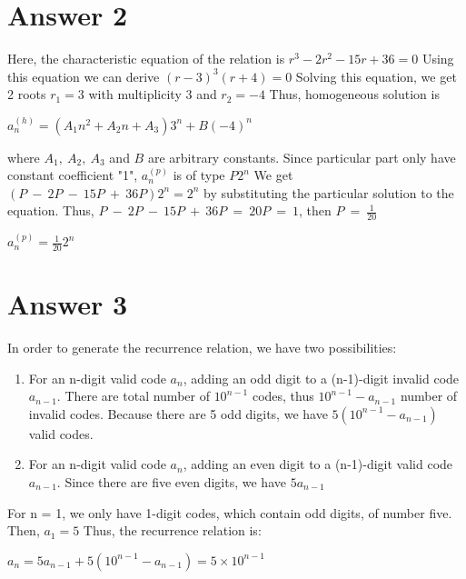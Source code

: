 \documentclass[11pt]{article}
\begin{document}
\section*{Answer 2}
Here, the characteristic equation of the relation is $r^3 - 2r^2 - 15r + 36 = 0$ \newline
Using this equation we can derive $(r-3)^3(r+4) = 0$ \newline
Solving this equation, we get 2 roots $r_1 = 3$ with multiplicity 3 and $r_2 = -4$ \newline
Thus, homogeneous solution is \newline \newline
\centerline{$a^{(h)}_n = (A_1n^2 + A_2n + A_3)3^n + B(-4)^n$} \newline \newline
where $A_1,\:A_2,\:A_3$ and $B$ are arbitrary constants.\newline \newline
Since particular part only have constant coefficient "1", $a^{(p)}_n$ is of type $P 2^n$ \newline
We get $(P\:-\:2P\:-\:15P\:+\:36P)2^n = 2^n$ by substituting the particular solution to the equation. Thus, \newline \newline
$P\:-\:2P\:-\:15P\:+\:36P\:=\:20P\:=\:1$, then $P\:=\:\frac{1}{20}$\newline \newline
\centerline{$a^{(p)}_n = \frac{1}{20}2^n$}
\section*{Answer 3}
In order to generate the recurrence relation, we have two possibilities: 
\begin{enumerate}
    \item For an n-digit valid code $a_n$, adding an odd digit to a (n-1)-digit invalid code $a_{n-1}$. There are total number of $10^{n-1}$ codes, thus $10^{n-1} - a_{n-1}$ number of invalid codes. Because there are 5 odd digits, we have $5(10^{n-1} - a_{n-1})$ valid codes.
    \item For an n-digit valid code $a_n$, adding an even digit to a (n-1)-digit valid code $a_{n-1}$. Since there are five even digits, we have $5a_{n-1}$
\end{enumerate}
    For n = 1, we only have 1-digit codes, which contain odd digits, of number five. Then, $a_1 = 5$ Thus, the recurrence relation is:\newline \newline
    \centerline{$a_n = 5a_{n-1} + 5(10^{n-1} - a_{n-1}) = 5 \times 10^{n-1}$}
\newpage
\end{document}
